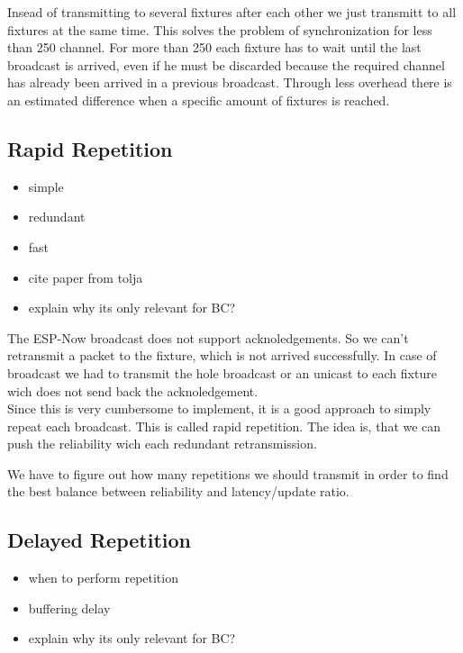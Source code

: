 \documentclass[]{ccs-thesis}
\begin{document}
Insead of transmitting to several fixtures after each other we just transmitt to all fixtures at the same time.
This solves the problem of synchronization for less than 250 channel.
For more than 250 each fixture has to wait until the last broadcast is arrived, 
even if he must be discarded because the required channel has already been arrived in a previous broadcast.
Through less overhead there is an estimated difference when a specific amount of fixtures is reached.

\subsection*{Rapid Repetition}
\begin{itemize}
\item simple
\item redundant
\item fast
\item cite paper from tolja
\item explain why its only relevant for BC?
\end{itemize}

The ESP-Now broadcast does not support acknoledgements.
So we can't retransmit a packet to the fixture, which is not arrived successfully.
In case of broadcast we had to transmit the hole broadcast or an unicast to each fixture wich does not send back the acknoledgement.\\

Since this is very cumbersome to implement, it is a good approach to simply repeat each broadcast. 
This is called rapid repetition. 
The idea is, that we can push the reliability wich each redundant retransmission.

We have to figure out how many repetitions we should transmit in order to find the best balance between reliability and latency/update ratio.

\subsection*{Delayed Repetition}
\begin{itemize}
\item when to perform repetition
\item buffering delay
\item explain why its only relevant for BC?
\end{itemize}
\end{document}
